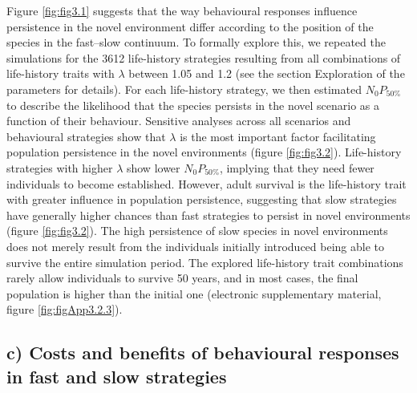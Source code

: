 Figure \ref{fig:fig3.1} suggests that the way behavioural responses influence
persistence in the novel environment differ according to the position
of the species in the fast–slow continuum. To formally
explore this, we repeated the simulations for the 3612 life-history
strategies resulting from all combinations of life-history
traits with $\lambda$ between 1.05 and 1.2 (see the section Exploration
of the parameters for details). For each life-history strategy,
we then estimated $N_{0}P_{50\%}$ to describe the likelihood that
the species persists in the novel scenario as a function of their behaviour.
Sensitive analyses across all scenarios and behavioural
strategies show that $\lambda$ is the most important factor facilitating
population persistence in the novel environments (figure \ref{fig:fig3.2}).
Life-history strategies with higher $\lambda$ show lower $N_{0}P_{50\%}$, implying
that they need fewer individuals to become established.
However, adult survival is the life-history trait with greater
influence in population persistence, suggesting that slow strategies
have generally higher chances than fast strategies to
persist in novel environments (figure \ref{fig:fig3.2}). The high persistence
of slow species in novel environments does not merely result
from the individuals initially introduced being able to survive
the entire simulation period. The explored life-history trait combinations
rarely allow individuals to survive 50 years, and in
most cases, the final population is higher than the initial one
(electronic supplementary material, figure \ref{fig:figApp3.2.3}).


\subsection*{c) Costs and benefits of behavioural responses in fast and slow strategies}

